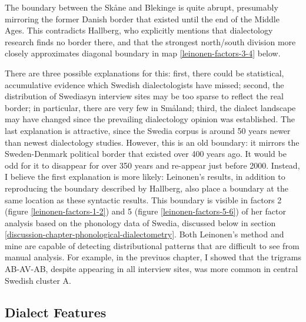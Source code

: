 The boundary between the Sk\aa{}ne and Blekinge is quite abrupt,
presumably mirroring the former Danish border that existed until the
end of the Middle Ages. This contradicts Hallberg, who explicitly
mentions that dialectology research finds no border there, and
that the strongest north/south division more closely approximates
 diagonal boundary in map
\ref{leinonen-factors-3-4} below.

There are three possible explanations for this: first, there could be
statistical, accumulative evidence which Swedish dialectologists have
missed; second, the distribution of Swediasyn interview sites may be
too sparse to reflect the real border; in particular, there are very
few in Sm\aa{}land; third, the dialect landscape may have changed
since the prevailing dialectology opinion was established.  The last
explanation is attractive, since the Swedia corpus is around 50 years
newer than newest dialectology studies. However, this is an old
boundary: it mirrors the Sweden-Denmark political border that existed
over 400 years ago. It would be odd for it to disappear for over 350
years and re-appear just before 2000. Instead, I believe the first
explanation is more likely: Leinonen's results, in addition to
reproducing the boundary described by Hallberg, also place a boundary
at the same location as these syntactic results. This boundary is
visible in factors 2 (figure \ref{leinonen-factors-1-2}) and 5 (figure
\ref{leinonen-factors-5-6}) of her factor analysis based on the
phonology data of Swedia, discussed below in section
\ref{discussion-chapter-phonological-dialectometry}. Both Leinonen's
method and mine are capable of detecting distributional patterns that
are difficult to see from manual analysis. For example, in the
previuos chapter, I showed that the trigrams AB-AV-AB, despite
appearing in all interview sites, was more common in central Swedish
cluster A.



\subsection{Dialect Features}


